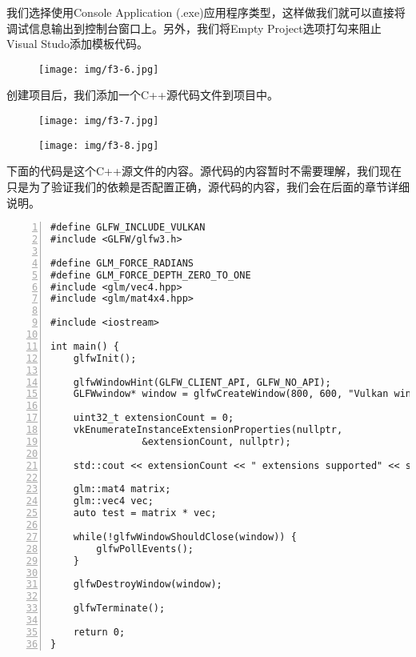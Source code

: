 \documentclass{ctexart}
\begin{document}
我们选择使用Console Application (.exe)应用程序类型，这样做我们就可以直接将调试信息输出到控制台窗口上。另外，我们将Empty Project选项打勾来阻止Visual Studo添加模板代码。

\begin{figure}[H]
	\centering
	\texttt{[image: img/f3-6.jpg]}
\end{figure}

创建项目后，我们添加一个C++源代码文件到项目中。

\begin{figure}[H]
	\centering
	\texttt{[image: img/f3-7.jpg]}
\end{figure}

\begin{figure}[H]
	\centering
	\texttt{[image: img/f3-8.jpg]}
\end{figure}

下面的代码是这个C++源文件的内容。源代码的内容暂时不需要理解，我们现在只是为了验证我们的依赖是否配置正确，源代码的内容，我们会在后面的章节详细说明。

\begin{lstlisting}[language={[ANSI]C},keywordstyle=\color{blue!70},commentstyle=\color{red!50!green!50!blue!50},frame=shadowbox, rulesepcolor=\color{red!20!green!20!blue!20},basicstyle=\small,numbers=left, numberstyle=\tiny,breaklines=true]
#define GLFW_INCLUDE_VULKAN
#include <GLFW/glfw3.h>

#define GLM_FORCE_RADIANS
#define GLM_FORCE_DEPTH_ZERO_TO_ONE
#include <glm/vec4.hpp>
#include <glm/mat4x4.hpp>

#include <iostream>

int main() {
	glfwInit();

	glfwWindowHint(GLFW_CLIENT_API, GLFW_NO_API);
	GLFWwindow* window = glfwCreateWindow(800, 600, "Vulkan window", nullptr, nullptr);

	uint32_t extensionCount = 0;
	vkEnumerateInstanceExtensionProperties(nullptr,
				&extensionCount, nullptr);

	std::cout << extensionCount << " extensions supported" << std::endl;

	glm::mat4 matrix;
	glm::vec4 vec;
	auto test = matrix * vec;

	while(!glfwWindowShouldClose(window)) {
		glfwPollEvents();
	}

	glfwDestroyWindow(window);

	glfwTerminate();

	return 0;
}
\end{lstlisting}
\end{document}
